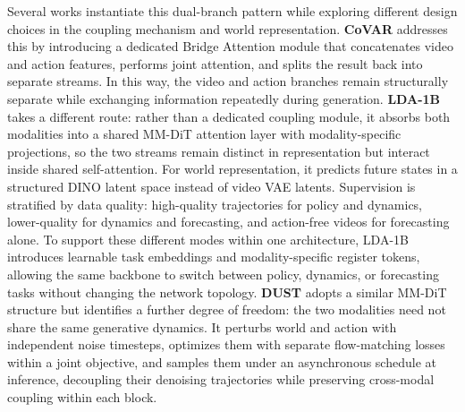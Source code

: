 Several works instantiate this dual-branch pattern while exploring different design choices in the coupling mechanism and world representation. 
\textbf{CoVAR} \cite{CoVAR} addresses this by introducing a dedicated Bridge Attention module that concatenates video and action features, performs joint attention, and splits the result back into separate streams. In this way, the video and action branches remain structurally separate while exchanging information repeatedly during generation.
\textbf{LDA-1B} \cite{LDA1B} takes a different route: rather than a dedicated coupling module, it absorbs both modalities into a shared MM-DiT attention layer with modality-specific projections, so the two streams remain distinct in representation but interact inside shared self-attention. For world representation, it predicts future states in a structured DINO latent space instead of video VAE latents.
Supervision is stratified by data quality: high-quality trajectories for policy and dynamics, lower-quality for dynamics and forecasting, and action-free videos for forecasting alone. To support these different modes within one architecture, LDA-1B introduces learnable task embeddings and modality-specific register tokens, allowing the same backbone to switch between policy, dynamics, or forecasting tasks without changing the network topology.
\textbf{DUST} \cite{DUST} adopts a similar MM-DiT structure but identifies a further degree of freedom: the two modalities need not share the same generative dynamics. It perturbs world and action with independent noise timesteps, optimizes them with separate flow-matching losses within a joint objective, and samples them under an asynchronous schedule at inference, decoupling their denoising trajectories while preserving cross-modal coupling within each block.


